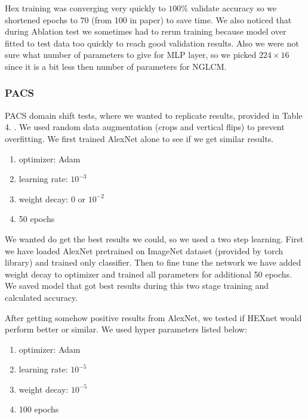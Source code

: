 \documentclass{article} %
\begin{document}
    Hex training was converging very quickly to $100\%$ validate accuracy so we shortened epochs to 70 (from 100 in paper) to save time.
    We also noticed that during Ablation test we sometimes had to rerun training because model over fitted to test
    data too quickly to reach good validation results. Also we were not sure what number of parameters to give for MLP layer,
    so we picked $224\times16$ since it is a bit less then number of parameters for NGLCM.

\subsubsection{PACS}
    PACS domain shift tests, where we wanted to replicate results, provided in Table 4. \citep{wang2018learning}. We used random data augmentation (crops and vertical flips) to prevent overfitting.
    We first trained AlexNet alone to see if we get similar results.
        
        \begin{enumerate}
            \item optimizer: Adam
            \item learning rate: $10^{-3}$
            \item weight decay: $0$ or $10^{-2}$
            \item 50 epochs
        \end{enumerate}

    We wanted do get the best results we could, so we used a two step learning. First we have loaded AlexNet pretrained
    on ImageNet dataset (provided by torch library) and trained only classifier. Then to fine tune the network we have added
    weight decay to optimizer and trained all parameters for additional 50 epochs. We saved model that got best results during
    this two stage training and calculated accuracy.

    \pagebreak

    After getting somehow positive results from AlexNet, we tested if HEXnet would perform better or similar. We used hyper parameters listed below:
        
        \begin{enumerate}
            \item optimizer: Adam
            \item learning rate: $10^{-5}$
            \item weight decay: $10^{-5}$
            \item 100 epochs
        \end{enumerate}
\end{document}
